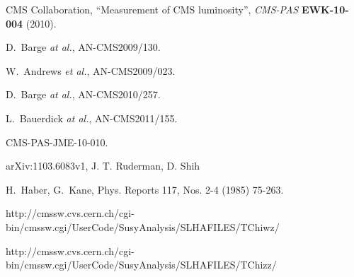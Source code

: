 \begin{thebibliography}{10}
{CMS Collaboration}, ``Measurement of CMS luminosity'', {\em CMS-PAS} {\bf
  EWK-10-004} (2010).

 D.~Barge {\em at al.}, AN-CMS2009/130.

 W.~Andrews {\em et al.}, AN-CMS2009/023.

 D.~Barge {\em at al.}, AN-CMS2010/257.

 L.~Bauerdick {\em at al.}, AN-CMS2011/155.

 CMS-PAS-JME-10-010.

 arXiv:1103.6083v1, J. T. Ruderman, D. Shih

H.~Haber, G.~Kane, Phys. Reports 117, Nos. 2-4 (1985) 75-263.

 http://cmssw.cvs.cern.ch/cgi-bin/cmssw.cgi/UserCode/SusyAnalysis/SLHAFILES/TChiwz/

 http://cmssw.cvs.cern.ch/cgi-bin/cmssw.cgi/UserCode/SusyAnalysis/SLHAFILES/TChizz/

\end{thebibliography}
